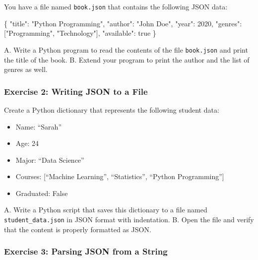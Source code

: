 \documentclass[
  letterpaper,
  DIV=11,
  numbers=noendperiod]{scrreprt}
\newenvironment{Shaded}{\begin{snugshade}}{\end{snugshade}}
\newcommand{\DataTypeTok}[1]{\textcolor[rgb]{0.68,0.00,0.00}{#1}}
\newcommand{\DecValTok}[1]{\textcolor[rgb]{0.68,0.00,0.00}{#1}}
\newcommand{\FunctionTok}[1]{\textcolor[rgb]{0.28,0.35,0.67}{#1}}
\newcommand{\KeywordTok}[1]{\textcolor[rgb]{0.00,0.23,0.31}{#1}}
\newcommand{\OtherTok}[1]{\textcolor[rgb]{0.00,0.23,0.31}{#1}}
\newcommand{\StringTok}[1]{\textcolor[rgb]{0.13,0.47,0.30}{#1}}
\providecommand{\tightlist}{%
  \setlength{\itemsep}{0pt}\setlength{\parskip}{0pt}}\usepackage{longtable,booktabs,array}
\begin{document}
You have a file named \texttt{book.json} that contains the following
JSON data:

\begin{Shaded}
\begin{Highlighting}[]
\FunctionTok{\{}
    \DataTypeTok{"title"}\FunctionTok{:} \StringTok{"Python Programming"}\FunctionTok{,}
    \DataTypeTok{"author"}\FunctionTok{:} \StringTok{"John Doe"}\FunctionTok{,}
    \DataTypeTok{"year"}\FunctionTok{:} \DecValTok{2020}\FunctionTok{,}
    \DataTypeTok{"genres"}\FunctionTok{:} \OtherTok{[}\StringTok{"Programming"}\OtherTok{,} \StringTok{"Technology"}\OtherTok{]}\FunctionTok{,}
    \DataTypeTok{"available"}\FunctionTok{:} \KeywordTok{true}
\FunctionTok{\}}
\end{Highlighting}
\end{Shaded}

A. Write a Python program to read the contents of the file
\texttt{book.json} and print the title of the book. B. Extend your
program to print the author and the list of genres as well.

\hypertarget{exercise-2-writing-json-to-a-file}{%
\subsubsection{Exercise 2: Writing JSON to a
File}\label{exercise-2-writing-json-to-a-file}}

Create a Python dictionary that represents the following student data:

\begin{itemize}
\tightlist
\item
  Name: ``Sarah''
\item
  Age: 24
\item
  Major: ``Data Science''
\item
  Courses: {[}``Machine Learning'', ``Statistics'', ``Python
  Programming''{]}
\item
  Graduated: False
\end{itemize}

A. Write a Python script that saves this dictionary to a file named
\texttt{student\_data.json} in JSON format with indentation. B. Open the
file and verify that the content is properly formatted as JSON.

\hypertarget{exercise-3-parsing-json-from-a-string}{%
\subsubsection{Exercise 3: Parsing JSON from a
String}\label{exercise-3-parsing-json-from-a-string}}
\end{document}
